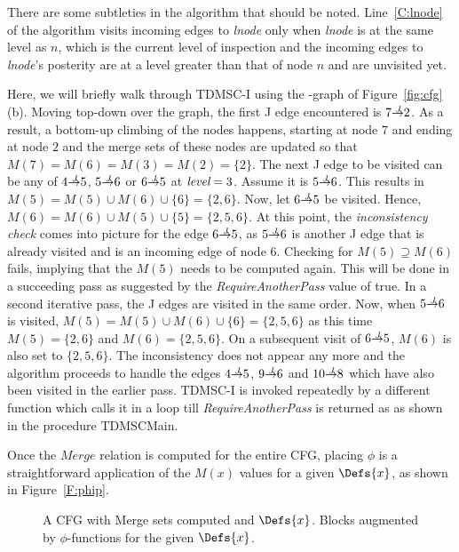 {There are some subtleties in the algorithm that should be noted. 
Line~\ref{C:lnode} of the algorithm visits incoming edges to \textit{lnode} 
only when \textit{lnode} is at the same level as $n$, which is the current 
level of inspection and the incoming edges to \textit{lnode}'s posterity are at 
a level greater than that of node $n$ and are unvisited yet. 

Here, we will briefly walk through TDMSC-I using the \DJ-graph of Figure~\ref{fig:cfg}(b). Moving top-down over the graph, the first J edge encountered is $7 \st{J} 2$. As a result, a bottom-up climbing of the nodes happens, starting at node $7$ and
ending at node $2$ and the merge sets of these nodes are updated so that $M(7) = M(6) = M(3) = M(2) = \{2\}$. The next J edge
to be visited can be any of $4 \st{J} 5$, $5 \st{J} 6$ or $6 \st{J} 5$ at 
$\textit{level} = 3$. Assume it is $5 \st{J} 6$. This results in $M(5) = M(5) \cup M(6) 
\cup \{6\} = \{2,6\}$. Now, let $6 \st{J} 5$ be visited. Hence, $M(6) = M(6) 
\cup M(5) \cup \{5\} = \{2,5,6\}$. At this point, the \emph{inconsistency check} 
comes into picture for the edge $6 \st{J} 5$, as $5 \st{J} 6$ is another J edge 
that is already visited and is an incoming edge of node $6$. Checking for $M(5) 
\supseteq M(6)$ fails, implying that the $M(5)$ needs to be computed again. 
This will be done in a succeeding pass as suggested by the 
\textit{RequireAnotherPass} value of true. In a second iterative pass, the J edges are visited in the same order. Now, when $5 \st{J} 6$ is visited, 
$M(5) = M(5) \cup M(6) \cup \{6\} = \{2,5,6\}$ as this time 
$M(5) = \{2,6\}$ 
and $M(6) = \{2,5,6\}$. On a subsequent visit of $6 \st{J} 5$, $M(6)$ is also set to $\{2,5,6\}$. The inconsistency does not appear any more and the algorithm proceeds to handle the edges $4 \st{J} 5$, $9 \st{J} 6$ and $10 \st{J} 8$ which have
also been visited in the earlier pass. TDMSC-I is invoked repeatedly by a different function
which calls it in a loop till \textit{RequireAnotherPass} is returned as \false as shown in the procedure TDMSCMain.

Once the $Merge$ relation is computed for the entire CFG, placing $\phi$ is a straightforward application of the $M(x)$ values for a given $\Defs{x}$, as shown in Figure~\ref{F:phip}.
\begin{figure}[!ht]
\centering
\begin{minipage}[t]{5in}
 A CFG with Merge sets computed and $\Defs{x}$.
 Blocks augmented by $\phi$-functions for the given $\Defs{x}$.


\end{minipage}
\end{figure}}
